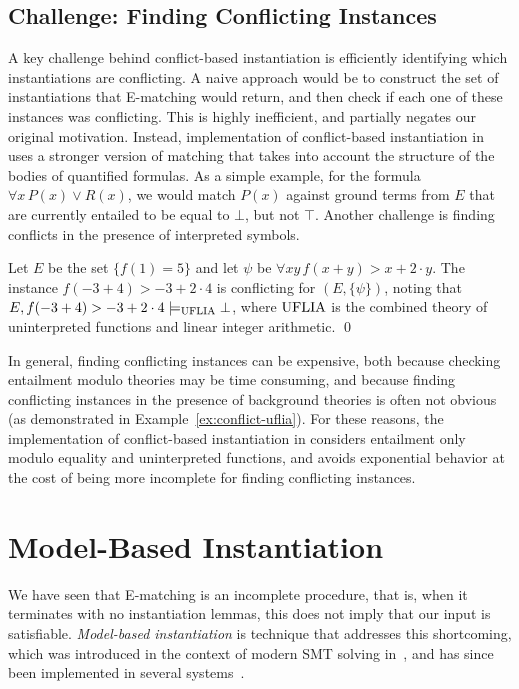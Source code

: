 \documentclass{easychair}
\begin{document}
\subsection{Challenge: Finding Conflicting Instances}
A key challenge behind conflict-based instantiation
is efficiently identifying which instantiations are conflicting.
A naive approach would be to construct the set of instantiations that E-matching would return, 
and then check if each one of these instances was conflicting.
This is highly inefficient, and partially negates our original motivation.
Instead, implementation of conflict-based instantiation in \cvc uses a stronger version of matching
that takes into account the structure of the bodies of quantified formulas.
As a simple example, for the formula $\forall x\, P( x ) \vee R( x )$, we would match
$P( x )$ against ground terms from $E$ that are currently entailed to be equal to $\bot$, but not $\top$.
Another challenge is finding conflicts in the presence of interpreted symbols.
\begin{example}
\label{ex:conflict-uflia}
Let $E$ be the set $\{ f( 1 ) = 5 \}$ and let $\psi$ be $\forall xy\, f( x + y ) > x + 2 \cdot y$.
The instance $f( -3 + 4 ) > -3 + 2 \cdot 4$ is conflicting for $( E, \{ \psi \} )$,
noting that $E, f( -3 + 4 ) > -3 + 2 \cdot 4 \models_{\mathrm{UFLIA}} \bot$, where $\mathrm{UFLIA}$ is the combined
theory of uninterpreted functions and linear integer arithmetic.
\qed
\end{example}
In general, finding conflicting instances can be expensive, 
both because checking entailment modulo theories may be time consuming,
and because finding conflicting instances in the presence of background theories is often not obvious (as demonstrated in Example~\ref{ex:conflict-uflia}).
For these reasons,
the implementation of conflict-based instantiation in \cvc
considers entailment only modulo equality and uninterpreted functions,
and avoids exponential behavior at the cost of being more incomplete for finding conflicting instances. 

\section{Model-Based Instantiation}
\label{sec:mbqi}

We have seen that E-matching is an incomplete procedure,
that is, when it terminates with no instantiation lemmas, this does not imply that our input is satisfiable.
\emph{Model-based instantiation} is technique that addresses this shortcoming,
which was introduced in the context of modern SMT solving in~\cite{GeDeM-CAV-09},
and has since been implemented in several systems~\cite{Jacobs09,ReyEtAl-CADE-13}.
\end{document}
